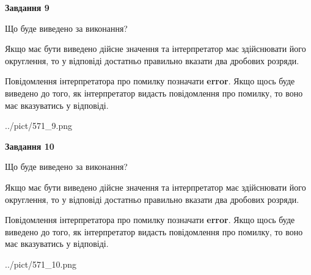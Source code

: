 \documentclass[12pt, ukrainian]{article}
\begin{document}
{\begin {Large}
{\begin {center}\textbf{Завдання 9}\end {center}}\par
Що буде виведено за виконання? \par

Якщо має бути виведено дійсне значення та інтерпретатор має здійснювати його округлення, 
то у відповіді достатньо правильно вказати два дробових розряди.

Повідомлення інтерпретатора про помилку позначати \textbf{error}.
Якщо щось буде виведено до того, як інтерпретатор видасть повідомлення про помилку, 
то воно має вказуватись у відповіді. \par

\begin{center}
	{../pict/571_9.png}
\end{center}
\newpage

{\begin {center}\textbf{Завдання 10}\end {center}}\par
Що буде виведено за виконання? \par

Якщо має бути виведено дійсне значення та інтерпретатор має здійснювати його округлення, 
то у відповіді достатньо правильно вказати два дробових розряди.

Повідомлення інтерпретатора про помилку позначати \textbf{error}.
Якщо щось буде виведено до того, як інтерпретатор видасть повідомлення про помилку, 
то воно має вказуватись у відповіді. \par

\begin{center}
	{../pict/571_10.png}
\end{center}
\newpage

\end {Large}}
\end{document}
